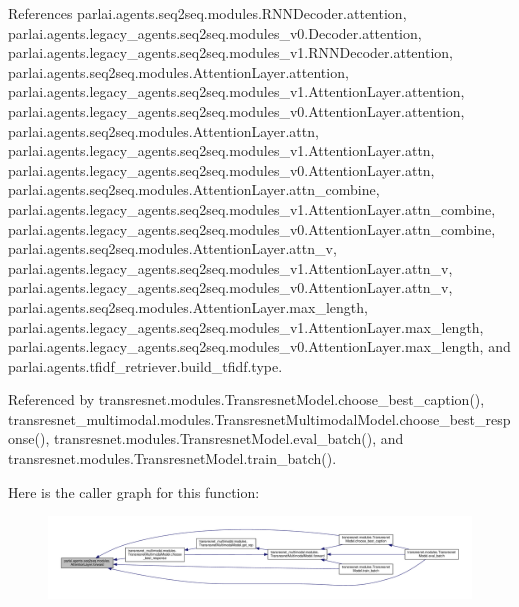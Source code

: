 References parlai.\+agents.\+seq2seq.\+modules.\+R\+N\+N\+Decoder.\+attention, parlai.\+agents.\+legacy\+\_\+agents.\+seq2seq.\+modules\+\_\+v0.\+Decoder.\+attention, parlai.\+agents.\+legacy\+\_\+agents.\+seq2seq.\+modules\+\_\+v1.\+R\+N\+N\+Decoder.\+attention, parlai.\+agents.\+seq2seq.\+modules.\+Attention\+Layer.\+attention, parlai.\+agents.\+legacy\+\_\+agents.\+seq2seq.\+modules\+\_\+v1.\+Attention\+Layer.\+attention, parlai.\+agents.\+legacy\+\_\+agents.\+seq2seq.\+modules\+\_\+v0.\+Attention\+Layer.\+attention, parlai.\+agents.\+seq2seq.\+modules.\+Attention\+Layer.\+attn, parlai.\+agents.\+legacy\+\_\+agents.\+seq2seq.\+modules\+\_\+v1.\+Attention\+Layer.\+attn, parlai.\+agents.\+legacy\+\_\+agents.\+seq2seq.\+modules\+\_\+v0.\+Attention\+Layer.\+attn, parlai.\+agents.\+seq2seq.\+modules.\+Attention\+Layer.\+attn\+\_\+combine, parlai.\+agents.\+legacy\+\_\+agents.\+seq2seq.\+modules\+\_\+v1.\+Attention\+Layer.\+attn\+\_\+combine, parlai.\+agents.\+legacy\+\_\+agents.\+seq2seq.\+modules\+\_\+v0.\+Attention\+Layer.\+attn\+\_\+combine, parlai.\+agents.\+seq2seq.\+modules.\+Attention\+Layer.\+attn\+\_\+v, parlai.\+agents.\+legacy\+\_\+agents.\+seq2seq.\+modules\+\_\+v1.\+Attention\+Layer.\+attn\+\_\+v, parlai.\+agents.\+legacy\+\_\+agents.\+seq2seq.\+modules\+\_\+v0.\+Attention\+Layer.\+attn\+\_\+v, parlai.\+agents.\+seq2seq.\+modules.\+Attention\+Layer.\+max\+\_\+length, parlai.\+agents.\+legacy\+\_\+agents.\+seq2seq.\+modules\+\_\+v1.\+Attention\+Layer.\+max\+\_\+length, parlai.\+agents.\+legacy\+\_\+agents.\+seq2seq.\+modules\+\_\+v0.\+Attention\+Layer.\+max\+\_\+length, and parlai.\+agents.\+tfidf\+\_\+retriever.\+build\+\_\+tfidf.\+type.



Referenced by transresnet.\+modules.\+Transresnet\+Model.\+choose\+\_\+best\+\_\+caption(), transresnet\+\_\+multimodal.\+modules.\+Transresnet\+Multimodal\+Model.\+choose\+\_\+best\+\_\+response(), transresnet.\+modules.\+Transresnet\+Model.\+eval\+\_\+batch(), and transresnet.\+modules.\+Transresnet\+Model.\+train\+\_\+batch().

Here is the caller graph for this function\+:
\nopagebreak
\begin{figure}[H]
\begin{center}
\leavevmode
\includegraphics[width=350pt]{classparlai_1_1agents_1_1seq2seq_1_1modules_1_1AttentionLayer_a1c840562c4d3d0a715b4d5ddb1b8bafe_icgraph}
\end{center}
\end{figure}


